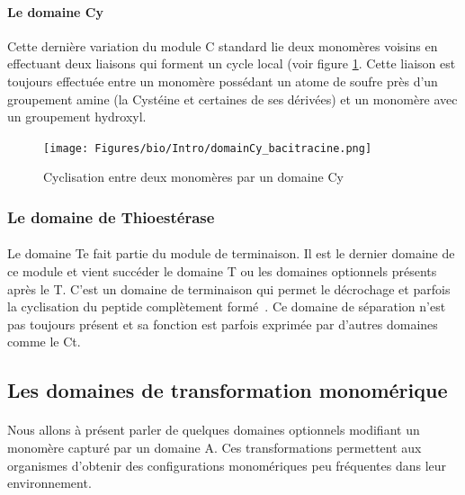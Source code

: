 \documentclass[12pt,french,twoside]{report}
\begin{document}
\paragraph{Le domaine Cy}
Cette dernière variation du module C standard lie deux monomères voisins en effectuant deux liaisons qui forment un cycle local (voir figure \ref{domaine_Cy}.
Cette liaison est toujours effectuée entre un monomère possédant un atome de soufre près d'un groupement amine (la Cystéine et certaines de ses dérivées) et un monomère avec un groupement hydroxyl.

\begin{figure}[h!]
  \begin{center}
    \texttt{[image: Figures/bio/Intro/domainCy\_bacitracine.png]}
    \caption{\label{domaine_Cy}Cyclisation entre deux monomères par un domaine Cy}
  \end{center}
\end{figure}


\subsubsection{Le domaine de Thioestérase}

\paragraph{}Le domaine Te fait partie du module de terminaison.
Il est le dernier domaine de ce module et vient succéder le domaine T ou les domaines optionnels présents après le T.
C'est un domaine de terminaison qui permet le décrochage et parfois la cyclisation du peptide complètement formé~\cite{trauger_peptide_2000,kohli_thioesterase_2002}.
Ce domaine de séparation n'est pas toujours présent et sa fonction est parfois exprimée par d'autres domaines comme le Ct.


\subsection{Les domaines de transformation monomérique}

\paragraph{}Nous allons à présent parler de quelques domaines optionnels modifiant un monomère capturé par un domaine A.
Ces transformations permettent aux organismes d'obtenir des configurations monomériques peu fréquentes dans leur environnement.
\end{document}
